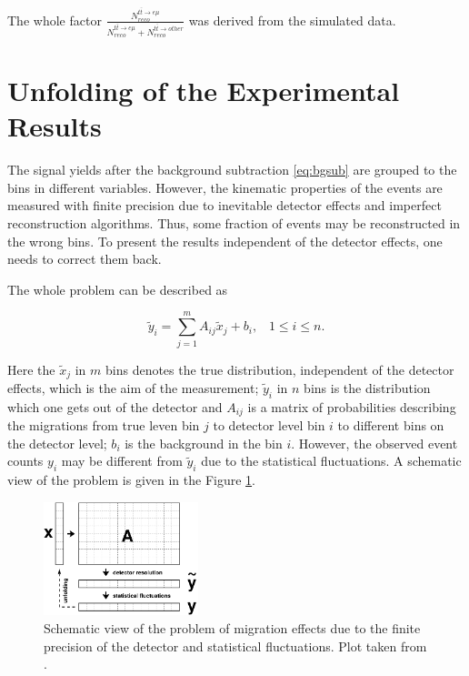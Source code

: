 The whole factor $\frac{N^{t\bar{t} \rightarrow e\mu}_{reco}}{N^{t\bar{t} \rightarrow e\mu}_{reco} + N^{t\bar{t} \rightarrow other}_{reco}}$ was derived
from the simulated data.

\section{Unfolding of the Experimental Results}\label{sec:unfold}

The signal yields after the background  subtraction \ref{eq:bgsub} are grouped to the bins in different variables. However, the kinematic properties
of the events are measured with finite precision due to inevitable detector effects and imperfect reconstruction algorithms.
Thus, some fraction of events may be reconstructed in the wrong bins. To present the results independent of the detector effects,
one needs to correct them back.

The whole problem can be described as

\begin{equation}\label{eq:UnfoldProb}
 \tilde{y}_i = \sum_{j = 1}^{m} A_{ij}\tilde{x}_{j} + b_{i}, \;\;\; 1 \leq i \leq n.
\end{equation}

Here the $\tilde{x}_j$ in $m$ bins denotes the true distribution, independent of the detector effects, which is the aim of the measurement;
$\tilde{y}_i$ in $n$ bins is the distribution which one gets out of the detector and $A_{ij}$ is a matrix of probabilities describing 
the migrations from true leven bin $j$ to detector level bin $i$ to different bins on the detector level; $b_{i}$ is the background in the bin $i$. 
However, the observed event counts $y_{i}$ may be different from $\tilde{y}_{i}$ due to the statistical fluctuations.
A schematic view of the problem is given in the Figure \ref{fig:scUnf}.

\begin{figure}[t]
  \centering
  \includegraphics[width=0.4\textwidth]{06_DiffXsec/plots/d12-129f1.png}
  \caption{Schematic view of the problem of migration effects due to the finite precision of the detector and statistical 
  fluctuations. Plot taken from \cite{Schmitt:2012kp}.}
  \label{fig:scUnf}
\end{figure}


